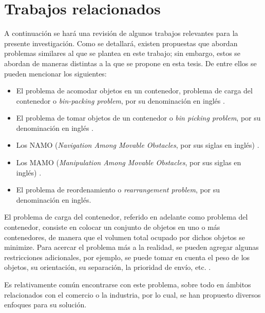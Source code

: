 \chapter{Trabajos relacionados}
\label{chap:trabajos_relacionados}
%
%
A continuación se hará una revisión de algunos trabajos relevantes para la presente investigación.
Como se detallará, existen propuestas que abordan problemas similares al que se plantea en este trabajo; sin embargo, estos se abordan de maneras distintas a la que se propone en esta tesis.
De entre ellos se pueden mencionar los siguientes: 
%
\begin{itemize}
	\item El problema de acomodar objetos en un contenedor, problema de carga del contenedor o \textit{bin-packing problem}, por su denominación en inglés \cite{doi:10.1287/opre.48.2.256.12386}\cite{10.5555/98124}.
	\item El problema de tomar objetos de un contenedor o \textit{bin picking problem}, por su denominación en inglés \cite{1699272}.
	\item Los NAMO (\textit{Navigation Among Movable Obstacles}, por sus siglas en inglés) \cite{doi:10.1142/S0219843605000545}.
	\item Los MAMO (\textit{Manipulation Among Movable Obstacles}, por sus siglas en inglés) \cite{4209604}.
	\item El problema de reordenamiento o \textit{rearrangement problem}, por su denominación en inglés.
\end{itemize}
%
%
%
%
El problema de carga del contenedor, referido en adelante como problema del contenedor, consiste en colocar un conjunto de objetos en uno o más contenedores, de manera que el volumen total ocupado por dichos objetos se minimize. 
Para acercar el problema más a la realidad, se pueden agregar algunas restricciones adicionales, por ejemplo, se puede tomar en cuenta el peso de los objetos, su orientación, su separación, la prioridad de envío, etc. \cite{BISCHOFF1995377}. 

Es relativamente común encontrarse con este problema, sobre todo en ámbitos relacionados con el comercio o la industria, por lo cual, se han propuesto diversos enfoques para su solución.

